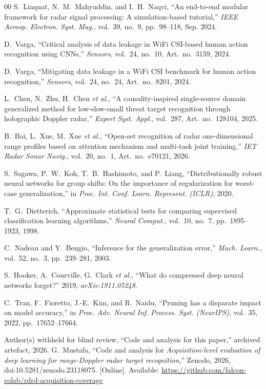 \documentclass{ICIC2026}
\begin{document}
\begin{thebibliography}{00}
 S.~Liaquat, N.~M.~Mahyuddin, and I.~H.~Naqvi, ``An end-to-end modular framework for radar signal processing: A simulation-based tutorial,'' \emph{IEEE Aerosp. Electron. Syst. Mag.}, vol.~39, no.~9, pp.~98--118, Sep. 2024.

 D.~Varga, ``Critical analysis of data leakage in WiFi CSI-based human action recognition using CNNs,'' \emph{Sensors}, vol.~24, no.~10, Art.~no.~3159, 2024.

 D.~Varga, ``Mitigating data leakage in a WiFi CSI benchmark for human action recognition,'' \emph{Sensors}, vol.~24, no.~24, Art.~no.~8201, 2024.

 L.~Chen, N.~Zhu, H.~Chen \emph{et al.}, ``A causality-inspired single-source domain generalized method for low-slow-small threat target recognition through holographic Doppler radar,'' \emph{Expert Syst. Appl.}, vol.~287, Art.~no.~128104, 2025.

 B.~Bai, L.~Xue, M.~Xue \emph{et al.}, ``Open-set recognition of radar one-dimensional range profiles based on attention mechanism and multi-task joint training,'' \emph{IET Radar Sonar Navig.}, vol.~20, no.~1, Art.~no.~e70121, 2026.

 S.~Sagawa, P.~W.~Koh, T.~B.~Hashimoto, and P.~Liang, ``Distributionally robust neural networks for group shifts: On the importance of regularization for worst-case generalization,'' in \emph{Proc. Int. Conf. Learn. Represent. (ICLR)}, 2020.

 T.~G.~Dietterich, ``Approximate statistical tests for comparing supervised classification learning algorithms,'' \emph{Neural Comput.}, vol.~10, no.~7, pp.~1895--1923, 1998.

 C.~Nadeau and Y.~Bengio, ``Inference for the generalization error,'' \emph{Mach. Learn.}, vol.~52, no.~3, pp.~239--281, 2003.

 S.~Hooker, A.~Courville, G.~Clark \emph{et al.}, ``What do compressed deep neural networks forget?'' 2019, \emph{arXiv:1911.05248}.

 C.~Tran, F.~Fioretto, J.-E.~Kim, and R.~Naidu, ``Pruning has a disparate impact on model accuracy,'' in \emph{Proc. Adv. Neural Inf. Process. Syst. (NeurIPS)}, vol.~35, 2022, pp.~17652--17664.



\ifblind
{} Author(s) withheld for blind review, ``Code and analysis for this paper,'' archived artefact, 2026.
\else
{} G.~Mustafa, ``Code and analysis for \emph{Acquisition-level evaluation of deep learning for range-Doppler radar target recognition},'' Zenodo, 2026, doi:10.5281/zenodo.23118075. [Online]. Available: \url{https://github.com/falcon-colab/rdrd-acquisition-coverage}
\fi

\end{thebibliography}
\end{document}
